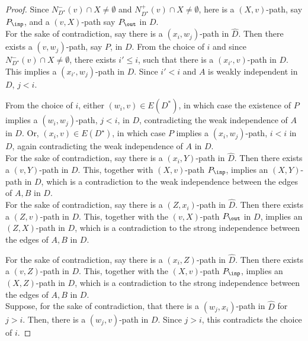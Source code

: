 \begin{proof}
Since $N_{D^{\star}}^-(v) \cap X \neq \emptyset$ and $N_{D^{\star}}^+(v) \cap X \neq \emptyset$, 
here is a $(X,v)$-path, say $P_{\inp}$, and a $(v,X)$-path say $P_{\out}$ in $D$.\\

 For the sake of contradiction, say there is a $(x_i,w_j)$-path in $\widehat{D}$. Then there exists a $(v,w_j)$-path, say $P$, in $D$. 
From the choice of $i$ and since $N_{D^{\star}}^-(v) \cap X \neq \emptyset$, there exists $i' \leq i$, such that there is a $(x_{i'},v)$-path in $D$. This implies a $(x_{i'},w_j)$-path in $D$. Since $i' <i$ and $A$ is weakly independent in $D$, $j < i$. 

From the choice of $i$, either $(w_i,v) \in E(D^*)$, in which case the existence of $P$ implies a $(w_i,w_j)$-path, $j<i$, in $D$, contradicting the weak independence of $A$ in $D$. Or, $(x_i,v) \in E(D^{\star})$, in which case $P$ implies a $(x_i,w_j)$-path, $i <i$ in $D$, again contradicting the weak independence of $A$ in $D$.\\

 For the sake of contradiction, say there is a $(x_i,Y)$-path in $\widehat{D}$. 
Then there exists a $(v,Y)$-path in $D$. 
This, together with $(X,v)$-path $P_{\inp}$, implies an $(X,Y)$-path in $D$, which is a contradiction to the weak independence between the edges of $A, B$ in $D$.\\

 For the sake of contradiction, 
say there is a $(Z,x_i)$-path in $\widehat{D}$. 
Then there exists a $(Z,v)$-path in $D$. This, together with the $(v,X)$-path $P_{\out}$ in $D$, implies an $(Z,X)$-path in $D$, which is a contradiction to the strong independence between the edges of $A, B$ in $D$.

For the sake of contradiction, 
say there is a $(x_i,Z)$-path in $\widehat{D}$. 
Then there exists a $(v,Z)$-path in $D$. This, together with the $(X,v)$-path $P_{\inp}$, implies an $(X,Z)$-path in $D$, which is a contradiction to the strong independence between the edges of $A, B$ in $D$.\\

Suppose, for the sake of contradiction, that there is a $(w_j,x_i)$-path in $\widehat{D}$ for $j>i$. Then, there is a $(w_j,v)$-path in $D$. Since $j >i$, this contradicts the choice of $i$.


\end{proof}
